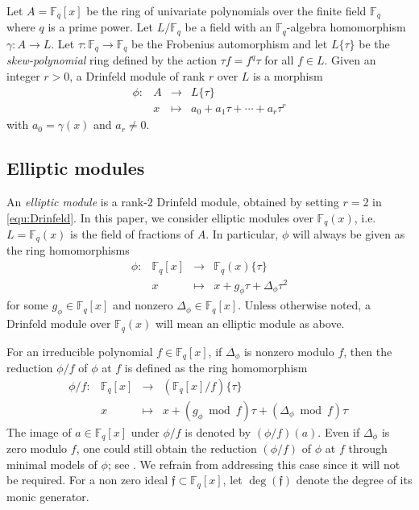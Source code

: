\documentclass[12pt]{article}
\theoremstyle{plain}
\theoremstyle{definition}
\newcommand{\ang}[1]{\{#1\}}
\def\F{\ensuremath{\mathbb{F}}}
\newcommand{\f}{\mathfrak f}
\begin{document}
Let $A = \F_q[x]$ be the ring of univariate polynomials over the finite field $\F_q$ where $q$ is a 
prime power. Let $L/\F_q$ be a field with an $\F_q$-algebra homomorphism $\gamma: A \rightarrow 
L$. Let $\tau: \F_q \rightarrow \F_q$ be the Frobenius automorphism and let $L\{\tau\}$ be the 
\textit{skew-polynomial} ring defined by the action $\tau f = f^q\tau$ for all $f \in L$. Given an 
integer $r > 0$, a Drinfeld module of rank $r$ over $L$ is a morphism
\begin{equation}
\label{equ:Drinfeld}
	\begin{array}{rrll}
		\phi : & A & \longrightarrow & L\{\tau\} \\
		& x & \longmapsto & a_0 + a_1\tau + \cdots + a_r\tau^r	
	\end{array}
\end{equation}
with $a_0 = \gamma(x)$ and $a_r \ne 0$. 




\subsection{Elliptic modules}
\label{drinfeld_section}

An \textit{elliptic module} is a rank-2 Drinfeld module, obtained by setting $r = 2$ in 
\eqref{equ:Drinfeld}. In this paper, we consider elliptic modules over $\F_q(x)$, i.e. $L = 
\F_q(x)$ is the field of fractions of $A$. In particular, $\phi$ will always be given as the ring 
homomorphisms
\[
\begin{array}{rrll}
	\phi : & \F_q[x] & \longrightarrow & \F_q(x)\ang{\tau} \\
	& x & \longmapsto & x + g_\phi \tau + \Delta_\phi \tau^2	
\end{array}
\]
for some $g_\phi \in \F_q[x]$ and nonzero $\Delta_\phi \in \F_q[x]$. Unless otherwise noted, a 
Drinfeld module over $\F_q(x)$ will mean an elliptic module as above. 

For an irreducible polynomial $f \in \F_q[x]$, if $\Delta_\phi$ is nonzero modulo $f$, then the 
reduction $\phi/f$ of $\phi$ at $f$ is defined as the ring homomorphism
\[
\begin{array}{rrll}
	\phi/f : & \F_q[x] & \longrightarrow & (\F_q[x]/f) \ang{\tau} \\
	& x & \longmapsto & x + (g_\phi \bmod f) \tau + (\Delta_\phi\bmod f) \tau^.
\end{array}
\]
The image of $a \in \F_q[x]$ under $\phi/f$ is denoted by $(\phi/f)(a)$. Even if $\Delta_{\phi}$ is 
zero modulo $f$, one could still obtain the reduction $(\phi/f)$ of $\phi$ at $f$ through
minimal models of $\phi$; see \cite{gek1}. We refrain from addressing this case since it will not 
be required. For a non zero ideal $\f \subset \F_q[x]$, let $\deg(\f)$ denote the degree of its 
monic generator.
\end{document}
